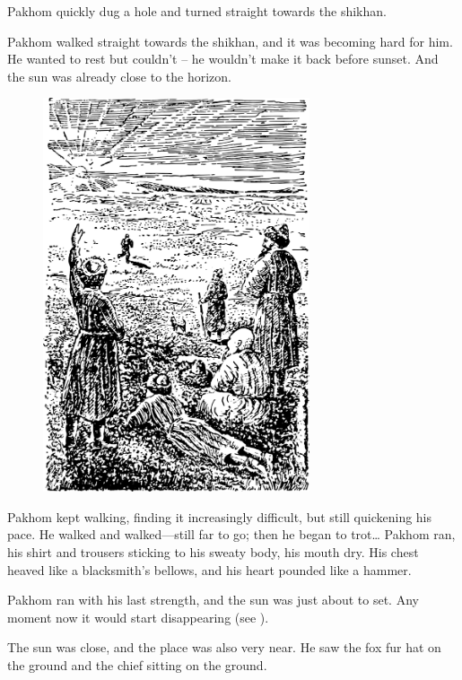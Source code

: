 Pakhom quickly dug a hole and turned straight towards the shikhan.

Pakhom walked straight towards the shikhan, and it was becoming hard for him. He wanted to rest but couldn’t -- he wouldn’t make it back before sunset. And the sun was already close to the horizon.

\begin{figure}[h!]
\centering
\includegraphics[width=0.7\textwidth]{figures/ch-12/fig-174.pdf}
\end{figure}

Pakhom kept walking, finding it increasingly difficult, but still quickening his pace. He walked and walked—still far to go; then he began to trot\dots{} Pakhom ran, his shirt and trousers sticking to his sweaty body, his mouth dry. His chest heaved like a blacksmith’s bellows, and his heart pounded like a hammer.

Pakhom ran with his last strength, and the sun was just about to set. Any moment now it would start disappearing (see ).

The sun was close, and the place was also very near. He saw the fox fur hat on the ground and the chief sitting on the ground.




